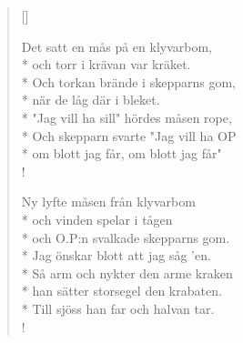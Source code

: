 
\settowidth{\versewidth}{"Jag vill ha sill" hördes måsen rope,}



\begin{verse}[\versewidth]

Det satt en mås på en klyvarbom,\\*
och torr i krävan var kräket.\\*
Och torkan brände i skepparns gom,\\*
när de låg där i bleket.\\*
"Jag vill ha sill" hördes måsen rope,\\*
Och skepparn svarte "Jag vill ha OP\\*
om blott jag får, om blott jag får"\\!


Ny lyfte måsen från klyvarbom\\*
och vinden spelar i tågen\\*
och O.P:n svalkade skepparns gom.\\*
Jag önskar blott att jag såg 'en.\\*
Så arm och nykter den arme kraken\\*
han sätter storsegel den krabaten.\\*
Till sjöss han far och halvan tar.\\!


\end{verse}

